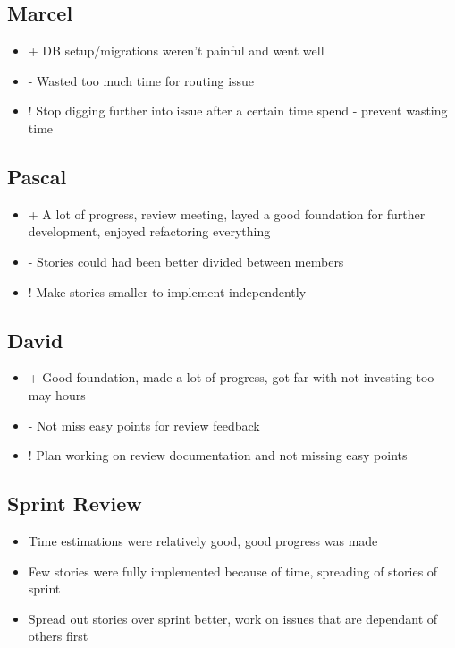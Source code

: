 \subsection{Marcel}
\begin{itemize}
    \item + DB setup/migrations weren't painful and went well
    \item - Wasted too much time for routing issue
    \item ! Stop digging further into issue after a certain time spend - prevent wasting time
\end{itemize}

\subsection{Pascal}
\begin{itemize}
    \item + A lot of progress, review meeting, layed a good foundation for further development, enjoyed refactoring everything
    \item - Stories could had been better divided between members
    \item ! Make stories smaller to implement independently
\end{itemize}

\subsection{David}
\begin{itemize}
    \item + Good foundation, made a lot of progress, got far with not investing too may hours
    \item - Not miss easy points for review feedback
    \item ! Plan working on review documentation and not missing easy points
\end{itemize}

\subsection{Sprint Review}
\begin{itemize}
    \item Time estimations were relatively good, good progress was made
    \item Few stories were fully implemented because of time, spreading of stories of sprint
    \item Spread out stories over sprint better, work on issues that are dependant of others first
\end{itemize}

